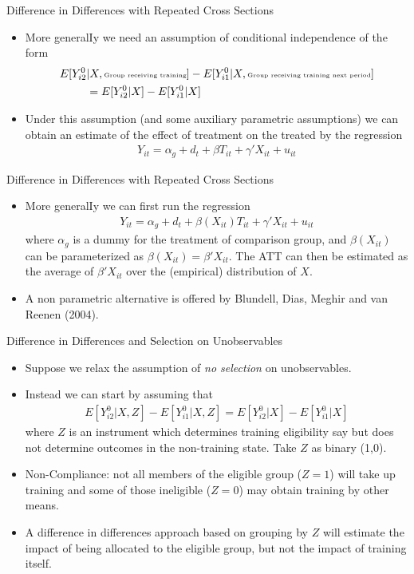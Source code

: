 \documentclass[xcolor=pdftex,dvipsnames,table,mathserif,aspectratio=169]{beamer}
\begin{document}
\begin{frame}{Difference in Differences with Repeated Cross Sections}
\begin{itemize}
\item More generalIy we need an assumption of conditional independence of the form
\begin{align*}
E[Y_{i2}^0 & | X, \text{\tiny Group receiving training}]-E[Y_{i1}^0| X, \text{\tiny Group receiving training next period}] \\
&= E[Y_{i2}^0 | X] - E[Y_{i1}^0 |X]
\end{align*}
\item Under this assumption (and some auxiliary parametric assumptions) we can obtain an estimate of the effect of treatment on the treated by the regression
\begin{align*}
Y_{it} = \alpha_g + d_t + \beta T_{it} + \gamma' X_{it} + u_{it}
\end{align*} 
\end{itemize}
\end{frame}

\begin{frame}{Difference in Differences with Repeated Cross Sections}
\begin{itemize}
\item More generalIy we can first run the regression 
\begin{align*}
Y_{it} = \alpha_g + d_t + \beta (X_{it}) T_{it} + \gamma' X_{it} + u_{it}
\end{align*} 
where $\alpha_g$ is a dummy for the treatment of comparison group, and $\beta (X_{it})$ can be parameterized as $\beta(X_{it}) = \beta' X_{it}$. The ATT can then be estimated as the average of $\beta' X_{it}$ over the (empirical) distribution of $X$.
\item A non parametric alternative is offered by Blundell, Dias, Meghir and van Reenen (2004).
\end{itemize}
\end{frame}

\begin{frame}{Difference in Differences and Selection on Unobservables}
\begin{itemize}
\item Suppose we relax the assumption of \emph{no selection} on unobservables. 
\item Instead we can start by assuming that
\begin{align*}
E[Y_{i2}^0 | X,Z] - E[Y_{i1}^0 | X,Z] = E[Y_{i2}^0 | X] - E[Y_{i1}^0 | X]
\end{align*} 
where $Z$ is an instrument which determines training eligibility say but does not determine outcomes in the non-training state. Take $Z$ as binary (1,0).
\item Non-Compliance: not all members of the eligible group ($Z = 1$) will take up training and some of those ineligible ($Z = 0$) may obtain training by other means.
\item A difference in differences approach based on grouping by $Z$ will estimate the impact of being allocated to the eligible group, but not the impact of training itself.
\end{itemize}
\end{frame}
\end{document}
